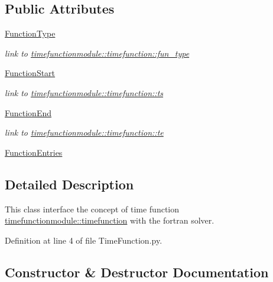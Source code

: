 \subsection*{Public Attributes}
\begin{DoxyCompactItemize}
\item 
\hyperlink{classgebtaero_1_1_time_function_1_1_time_function_a71eb6968c49304736305aee5c1e37d51}{Function\+Type}
\begin{DoxyCompactList}\small\item\em link to \hyperlink{structtimefunctionmodule_1_1timefunction_acd580915b25f29aa47c58467c394d2f4}{timefunctionmodule\+::timefunction\+::fun\+\_\+type} \end{DoxyCompactList}\item 
\hyperlink{classgebtaero_1_1_time_function_1_1_time_function_acd9020ddfc729ecc704fa0c246c2e903}{Function\+Start}
\begin{DoxyCompactList}\small\item\em link to \hyperlink{structtimefunctionmodule_1_1timefunction_a62e761e489833d17dcd1dbcac5c1dfd6}{timefunctionmodule\+::timefunction\+::ts} \end{DoxyCompactList}\item 
\hyperlink{classgebtaero_1_1_time_function_1_1_time_function_a21c1d719341196b82dd2def3400dd832}{Function\+End}
\begin{DoxyCompactList}\small\item\em link to \hyperlink{structtimefunctionmodule_1_1timefunction_a4378638965011462c9fd4a912f6dc8fd}{timefunctionmodule\+::timefunction\+::te} \end{DoxyCompactList}\item 
\hyperlink{classgebtaero_1_1_time_function_1_1_time_function_a4c6508caae8928d320b70e8ecd0ce27f}{Function\+Entries}
\end{DoxyCompactItemize}


\subsection{Detailed Description}
This class interface the concept of time function \hyperlink{structtimefunctionmodule_1_1timefunction}{timefunctionmodule\+::timefunction} with the fortran solver. 

Definition at line 4 of file Time\+Function.\+py.



\subsection{Constructor \& Destructor Documentation}
\mbox{\label{classgebtaero_1_1_time_function_1_1_time_function_a5f3a6ae6418be0f44d7a549af4a3f339}} 
